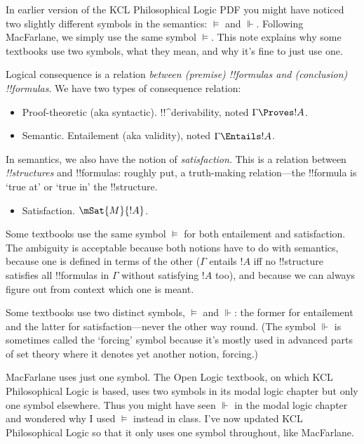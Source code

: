 \documentclass[../../../../include/open-logic-section]{subfiles}
\begin{document}


In earlier version of the KCL Philosophical Logic PDF you might have 
noticed two slightly different symbols in the semantics: $\vDash$ and 
$\Vdash$. Following MacFarlane, we simply use the same symbol $\vDash$. 
This note explains why some textbooks use two symbols, what they mean, 
and why it's fine to just use one. 

Logical consequence is a relation \emph{between (premise) !!{formula}s
and (conclusion) !!{formula}s}. We have two types of consequence 
relation:
\begin{itemize}
\item Proof-theoretic (aka syntactic). !!^{derivability}, noted $\Gamma \Proves !A$.
\item Semantic. Entailement (aka validity), noted $\Gamma \Entails !A$.
\end{itemize}
In semantics, we also have the notion of \emph{satisfaction}. This 
is a relation between \emph{!!{structure}s} and !!{formula}s:
roughly put, a truth-making relation---the !!{formula}
is `true at' or `true in' the !!{structure}.
\begin{itemize}
\item Satisfaction. $\mSat{M}{!A}$.
\end{itemize}

Some textbooks use the same symbol $\vDash$ for 
both entailement and satisfaction. The ambiguity is acceptable because
both notions have to do with semantics, because one is defined in terms 
of the other ($\Gamma$ entails $!A$ iff no !!{structure} satisfies all 
!!{formula}s in $\Gamma$ without satisfying $!A$ too), and because we 
can always figure out from context which one is meant. 

Some textbooks use two distinct symbols, $\vDash$ and $\Vdash$: the
former for entailement and the latter for satisfaction---never the
other way round. (The symbol $\Vdash$ is sometimes called the
`forcing' symbol because it's mostly used in advanced parts of set
theory where it denotes yet another notion, forcing.)

MacFarlane uses just one symbol. The Open Logic textbook, on which 
KCL Philosophical Logic is based, uses two symbols in its modal logic
chapter but only one symbol elsewhere. Thus you might have seen $\Vdash$
in the modal logic chapter and wondered why I used $\vDash$ instead in 
class. I've now updated KCL Philosophical Logic so that it only uses
one symbol throughout, like MacFarlane. 
\end{document}
